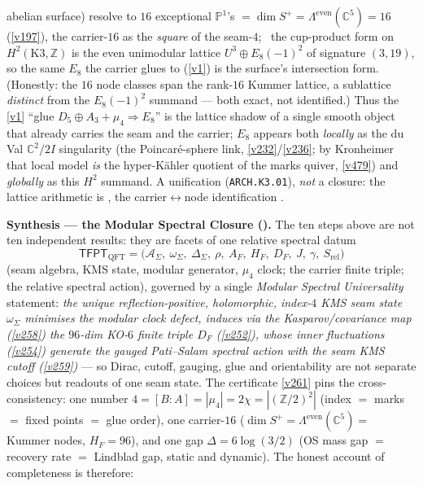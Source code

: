 \documentclass[11pt,a4paper]{article}
\newcommand{\Z}{\mathbb Z}
\begin{document}
\begin{keybox}
abelian surface) resolve to $16$ exceptional $\mathbb P^1$'s $=\dim S^+=\Lambda^{\mathrm{even}}(\mathbb
C^5)=16$ (\vref{v197}), the carrier-$16$ as the \emph{square} of the seam-$4$; \mE\ the cup-product form on
$H^2(\mathrm{K3},\Z)$ is the even unimodular lattice $U^3\oplus E_8({-}1)^2$ of signature $(3,19)$, so the
same $E_8$ the carrier glues to (\vref{v1}) is the surface's intersection form. (Honestly: the $16$ node
classes span the rank-$16$ Kummer lattice, a sublattice \emph{distinct} from the $E_8({-}1)^2$ summand ---
both exact, not identified.) Thus the \vref{v1} ``glue $D_5{\oplus}A_3{+}\mu_4{\Rightarrow}E_8$'' is the
lattice shadow of a single smooth object that already carries the seam and the carrier; $E_8$ appears both
\emph{locally} as the du Val $\mathbb C^2/2I$ singularity (the Poincar\'e-sphere link, \vref{v232}/\vref{v236};
by Kronheimer that local model \emph{is} the hyper-K\"ahler quotient of the marks quiver, \vref{v479})
and \emph{globally} as this $H^2$ summand. A unification (\texttt{ARCH.K3.01}), \emph{not} a closure: the
lattice arithmetic is \mE, the carrier$\leftrightarrow$node identification \mC.
\par\smallskip\noindent\textbf{Synthesis --- the Modular Spectral Closure ().}
The ten steps above are not ten independent results: they are facets of one relative spectral datum
\[
  \boxed{\ \mathsf{TFPT}_{\mathrm{QFT}}=\bigl(\mathcal A_\Sigma,\ \omega_\Sigma,\ \Delta_\Sigma,\ \rho,\
  A_F,\ H_F,\ D_F,\ J,\ \gamma,\ S_{\mathrm{rel}}\bigr)\ }
\]
(seam algebra, KMS state, modular generator, $\mu_4$ clock; the carrier finite triple; the relative
spectral action), governed by a single \emph{Modular Spectral Universality} statement: \emph{the unique
reflection-positive, holomorphic, index-$4$ KMS seam state $\omega_\Sigma$ minimises the modular clock
defect, induces via the Kasparov/covariance map (\vref{v258}) the $96$-dim KO-$6$ finite triple $D_F$
(\vref{v252}), whose inner fluctuations (\vref{v254}) generate the gauged Pati--Salam spectral action with
the seam KMS cutoff (\vref{v259})} --- so Dirac, cutoff, gauging, glue and orientability are not separate
choices but readouts of one seam state. The certificate \vref{v261} pins the cross-consistency: one number
$4=[B{:}A]=|\mu_4|=2\chi=|(\Z/2)^2|$ (index $=$ marks $=$ fixed points $=$ glue order), one carrier-$16$
($\dim S^+=\Lambda^{\mathrm{even}}(\mathbb C^5)=$ Kummer nodes, $H_F=96$), and one gap
$\Delta=6\log(3/2)$ (OS mass gap $=$ recovery rate $=$ Lindblad gap, static and dynamic). The honest
account of completeness is therefore:

\end{keybox}
\end{document}

